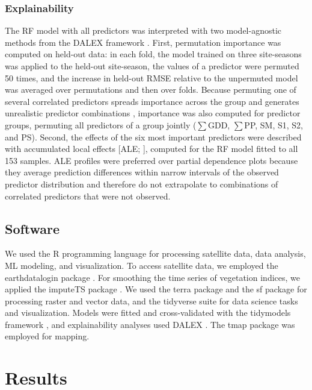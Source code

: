 \documentclass[
  english,
  review,
  number,
  sort,compress,
  authoryear,
  3p]{elsarticle}
\begin{document}
\subsubsection{Explainability}\label{explainability}

The RF model with all predictors was interpreted with two model-agnostic
methods from the DALEX framework \citep{Biecek2018}. First, permutation
importance was computed on held-out data: in each fold, the model
trained on three site-seasons was applied to the held-out site-season,
the values of a predictor were permuted 50 times, and the increase in
held-out RMSE relative to the unpermuted model was averaged over
permutations and then over folds. Because permuting one of several
correlated predictors spreads importance across the group and generates
unrealistic predictor combinations \citep{Strobl2008}, importance was
also computed for predictor groups, permuting all predictors of a group
jointly (\(\sum\)GDD, \(\sum\)PP, SM, S1, S2, and PS). Second, the
effects of the six most important predictors were described with
accumulated local effects {[}ALE; \citet{Apley2020}{]}, computed for the
RF model fitted to all 153 samples. ALE profiles were preferred over
partial dependence plots because they average prediction differences
within narrow intervals of the observed predictor distribution and
therefore do not extrapolate to combinations of correlated predictors
that were not observed.

\subsection{Software}\label{software}

We used the R programming language \citep{RCoreTeam2025} for processing
satellite data, data analysis, ML modeling, and visualization. To access
satellite data, we employed the earthdatalogin package
\citep{Boettiger2023}. For smoothing the time series of vegetation
indices, we applied the imputeTS package \citep{Moritz2017}. We used the
terra package \citep{Hijmans2023} and the sf package \citep{Pebesma2018}
for processing raster and vector data, and the tidyverse suite
\citep{Wickham2019} for data science tasks and visualization. Models
were fitted and cross-validated with the tidymodels framework
\citep{Kuhn2020}, and explainability analyses used DALEX
\citep{Biecek2018}. The tmap package \citep{Tennekes2018} was employed
for mapping.

\section{Results}\label{results}
\end{document}

